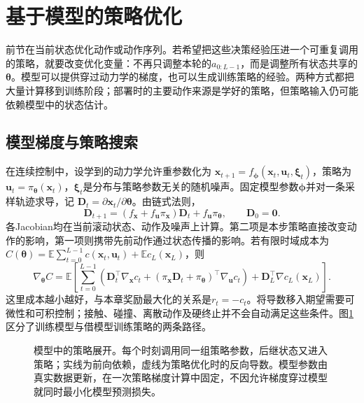 \section{基于模型的策略优化}
\label{sec:rl-learning-model-policy}

前节在当前状态优化动作或动作序列。若希望把这些决策经验压进一个可重复调用的策略，就要改变优化变量：不再只调整本轮的$a_{0:L-1}$，而是调整所有状态共享的$\bm\theta$。模型可以提供穿过动力学的梯度，也可以生成训练策略的经验。两种方式都把大量计算移到训练阶段；部署时的主要动作来源是学好的策略，但策略输入仍可能依赖模型中的状态估计。

\subsection{模型梯度与策略搜索}
\label{sec:rl-learning-model-gradient}

在连续控制中，设学到的动力学允许重参数化为
$\bm x_{t+1}=f_{\bm\phi}(\bm x_t,\bm u_t,\bm\xi_t)$，策略为
$\bm u_t=\pi_{\bm\theta}(\bm x_t)$，$\bm\xi_t$是分布与策略参数无关的随机噪声。固定模型参数$\bm\phi$并对一条采样轨迹求导，记
$\bm D_t=\partial\bm x_t/\partial\bm\theta$。由链式法则，
\begin{equation}
  \bm D_{t+1}
   =\left(f_{\bm x}+f_{\bm u}\pi_{\bm x}\right)\bm D_t
       +f_{\bm u}\pi_{\bm\theta},\qquad \bm D_0=\bm0.
  \label{eq:rl-learning-model-chain}
\end{equation}
各Jacobian均在当前滚动状态、动作及噪声上计算。第二项是本步策略直接改变动作的影响，第一项则携带先前动作通过状态传播的影响。若有限时域成本为
$C(\bm\theta)=\mathbb E\sum_{t=0}^{L-1}c(\bm x_t,\bm u_t)+
\mathbb E c_L(\bm x_L)$，则
\[
 \nabla_{\bm\theta}C
  =\mathbb E\left[
    \sum_{t=0}^{L-1}
      \left(\bm D_t^\top\nabla_{\bm x}c_t+
       (\pi_{\bm x}\bm D_t+\pi_{\bm\theta})^\top
                                       \nabla_{\bm u}c_t\right)
          +\bm D_L^\top\nabla c_L(\bm x_L)\right].
\]
这里成本越小越好，与本章奖励最大化的关系是$r_t=-c_t$。将导数移入期望需要可微性和可积控制；接触、碰撞、离散动作及硬终止并不会自动满足这些条件。图\ref{fig:rl-learning-model-gradient}区分了训练模型与借模型训练策略的两条路径。

\begin{figure}[t]
  \centering
  
  \caption{模型中的策略展开。每个时刻调用同一组策略参数，后继状态又进入策略；实线为前向依赖，虚线为策略优化时的反向导数。模型参数由真实数据更新，在一次策略梯度计算中固定，不因允许梯度穿过模型就同时最小化模型预测损失。}
  \label{fig:rl-learning-model-gradient}
\end{figure}

